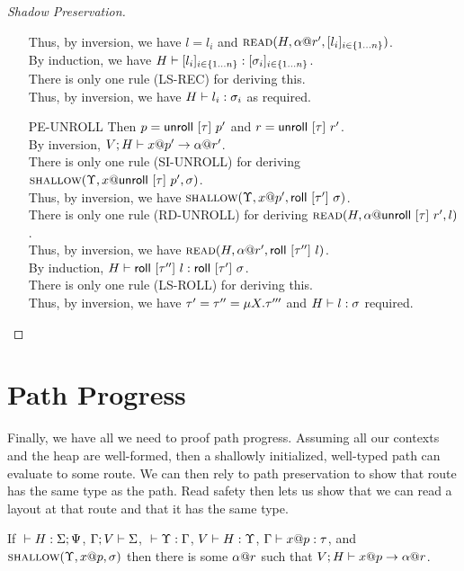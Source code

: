\begin{proof}[Shadow Preservation]
\begin{itemize}
      Thus, by inversion, we have $l=l_i$ and
      $\textsc{read}({H},{{\alpha}@{r'}},{[{{l}_{i}}]_{{i} \in \{1 \ldots {n}\} }})$.\\
      By induction, we have ${H} \vdash {[{{l}_{i}}]_{{i} \in \{1 \ldots {n}\} }} : {[{{\sigma}_{i}}]_{{i} \in \{1 \ldots {n}\} }}$.\\
      There is only one rule (\textsc{LS-REC}) for deriving this.\\
      Thus, by inversion, we have ${H} \vdash {l_i} : {\sigma_i}$ as required.
    \item[\textsc{PE-UNROLL}] 
      Then $p = \mathsf{unroll}~[{\tau}]~{p'}$ and $r = \mathsf{unroll}~[{\tau}]~{r'}$.\\
      By inversion, ${V;H} \vdash {{x}@{p'}} \to {{\alpha}@{r'}}$.\\
      There is only one rule (\textsc{SI-UNROLL}) for
      deriving $\textsc{shallow}({\Upsilon},{{x}@{\mathsf{unroll}~[{\tau}]~{p'}}},{\sigma})$.\\
      Thus, by inversion, we have $\textsc{shallow}({\Upsilon},{{x}@{p'}},{\mathsf{roll}~[{\tau'}]~{\sigma}})$.\\
      There is only one rule (\textsc{RD-UNROLL}) for
      deriving $\textsc{read}({H},{{\alpha}@{\mathsf{unroll}~[{\tau}]~{r'}}},{l})$.\\
      Thus, by inversion, we have $\textsc{read}({H},{{\alpha}@{r'}},{\mathsf{roll}~[{\tau''}]~{l}})$.\\
      By induction, ${H} \vdash {\mathsf{roll}~[{\tau''}]~{l}} : {\mathsf{roll}~[{\tau'}]~{\sigma}}$.\\
      There is only one rule (\textsc{LS-ROLL}) for deriving this.\\
      Thus, by inversion, we have $\tau' = \tau'' = \mu {X}.{\tau'''}$
      and ${H} \vdash {l} : {\sigma}$ required.
  \end{itemize}
\end{proof}

\section*{Path Progress}
Finally, we have all we need to proof path progress.
Assuming all our contexts and the heap are well-formed,
then a shallowly initialized, well-typed path can evaluate to some route.
We can then rely to path preservation to show that route has the same type as the path.
Read safety then lets us show that we can read a layout at that route
and that it has the same type.

\begin{lem}
  If ${} \vdash {H} : {\Sigma;\Psi}$, $\Gamma;V\vdash\Sigma$, ${} \vdash {\Upsilon} : {\Gamma}$, ${V} \vdash {H} : {\Upsilon}$,
  ${\Gamma} \vdash {{x}@{p}} : {\tau}$, and $\textsc{shallow}({\Upsilon},{{x}@{p}},{\sigma})$
  then there is some ${\alpha}@{r}$ such that ${V;H} \vdash {{x}@{p}} \to {{\alpha}@{r}}$.
\end{lem}


